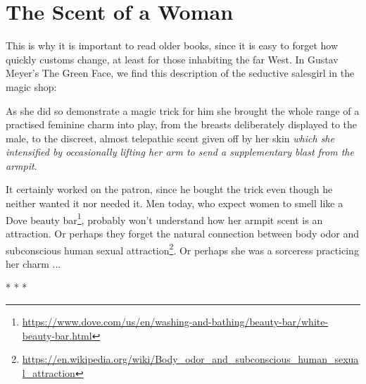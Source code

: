 \section{The Scent of a Woman}

This is why it is important to read older books, since it is easy to forget how quickly customs change, at least for those inhabiting the far West. In Gustav Meyer's The Green Face, we find this description of the seductive salesgirl in the magic shop:

\begin{quotex}
As she did so demonstrate a magic trick for him she brought the whole range of a practised feminine charm into play, from the breasts deliberately displayed to the male, to the discreet, almost telepathic scent given off by her skin \emph{which she intensified by occasionally lifting her arm to send a supplementary blast from the armpit}.
\end{quotex}


It certainly worked on the patron, since he bought the trick even though he neither wanted it nor needed it. Men today, who expect women to smell like a Dove beauty bar\footnote{\url{https://www.dove.com/us/en/washing-and-bathing/beauty-bar/white-beauty-bar.html}}, probably won't understand how her armpit scent is an attraction. Or perhaps they forget the natural connection between body odor and subconscious human sexual attraction\footnote{\url{https://en.wikipedia.org/wiki/Body\_odor\_and\_subconscious\_human\_sexual\_attraction}}. Or perhaps she was a sorceress practicing her charm ... 


\begin{center}* * *\end{center}

